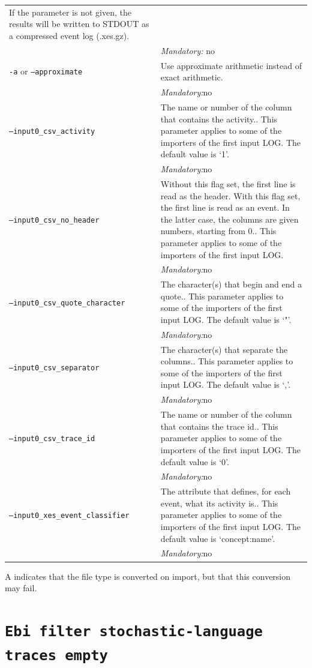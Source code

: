 {\begin{tabularx}{\linewidth}{lX}
If the parameter is not given, the results will be written to STDOUT as a compressed event log (.xes.gz).\\
&\textit{Mandatory:} \quad no\\
\texttt{-a} or \texttt{--approximate} & Use approximate arithmetic instead of exact arithmetic.\\
&\textit{Mandatory:}\quad no\\
\texttt{--input0\_csv\_activity} & The name or number of the column that contains the activity.. This parameter applies to some of the importers of the first input LOG. The default value is `1'.\\
&\textit{Mandatory:}\quad no\\
\texttt{--input0\_csv\_no\_header} & Without this flag set, the first line is read as the header. 
    With this flag set, the first line is read as an event. In the latter case, the columns are given numbers, starting from 0.. This parameter applies to some of the importers of the first input LOG. \\
&\textit{Mandatory:}\quad no\\
\texttt{--input0\_csv\_quote\_character} & The character(s) that begin and end a quote.. This parameter applies to some of the importers of the first input LOG. The default value is `"'.\\
&\textit{Mandatory:}\quad no\\
\texttt{--input0\_csv\_separator} & The character(s) that separate the columns.. This parameter applies to some of the importers of the first input LOG. The default value is `,'.\\
&\textit{Mandatory:}\quad no\\
\texttt{--input0\_csv\_trace\_id} & The name or number of the column that contains the trace id.. This parameter applies to some of the importers of the first input LOG. The default value is `0'.\\
&\textit{Mandatory:}\quad no\\
\texttt{--input0\_xes\_event\_classifier} & The attribute that defines, for each event, what its activity is.. This parameter applies to some of the importers of the first input LOG. The default value is `concept:name'.\\
&\textit{Mandatory:}\quad no\\
\bottomrule
\end{tabularx}
A \textdagger{} indicates that the file type is converted on import, but that this conversion may fail.
\clearpage\section{\texttt{Ebi filter stochastic-language traces empty}}
}
